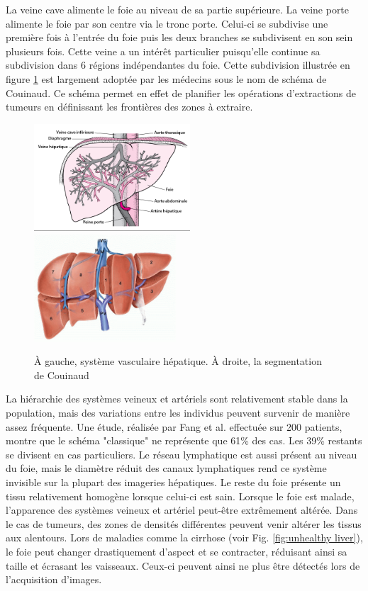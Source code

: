 La veine cave alimente le foie au niveau de sa partie supérieure. La veine porte alimente le foie par son centre via le tronc porte. Celui-ci se subdivise une première fois à l'entrée du foie puis les deux branches se subdivisent en son sein plusieurs fois. Cette veine a un intérêt particulier puisqu'elle continue sa subdivision dans 6 régions indépendantes du foie. Cette subdivision illustrée en figure \ref{fig:liver veins} est largement adoptée par les médecins sous le nom de schéma de Couinaud. Ce schéma permet en effet de planifier les opérations d'extractions de tumeurs en définissant les frontières des zones à extraire.

\begin{figure}
    \centering
    \includegraphics[height=4cm]{Images/Liver_vasculature.png}
    \includegraphics[height=4cm]{Images/Couinaud.png}
    \caption{À gauche, système vasculaire hépatique. À droite, la segmentation de Couinaud}
    \label{fig:liver veins}
\end{figure}


La hiérarchie des systèmes veineux et artériels sont relativement stable dans la population, mais des variations entre les individus peuvent survenir de manière assez fréquente. Une étude, réalisée par Fang et al. \cite{Fang2012_Liver_vein_variations} effectuée sur 200 patients, montre que le schéma "classique" ne représente que 61\% des cas. Les 39\% restants se divisent en cas particuliers. Le réseau lymphatique est aussi présent au niveau du foie, mais le diamètre réduit des canaux lymphatiques rend ce système invisible sur la plupart des imageries hépatiques. Le reste du foie présente un tissu relativement homogène lorsque celui-ci est sain.
Lorsque le foie est malade, l'apparence des systèmes veineux et artériel peut-être extrêmement altérée. Dans le cas de tumeurs, des zones de densités différentes peuvent venir altérer les tissus aux alentours. Lors de maladies comme la cirrhose (voir Fig. \ref{fig:unhealthy liver}), le foie peut changer drastiquement d'aspect et se contracter, réduisant ainsi sa taille et écrasant les vaisseaux. Ceux-ci peuvent ainsi ne plus être détectés lors de l'acquisition d'images. 

